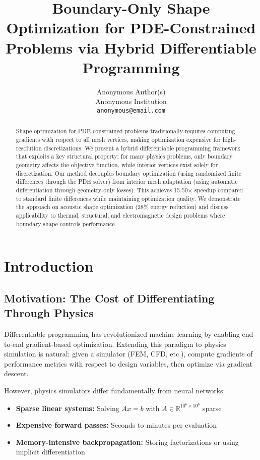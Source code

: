\documentclass{article}
\title{Boundary-Only Shape Optimization for PDE-Constrained Problems via Hybrid Differentiable Programming}
\author{%
  Anonymous Author(s) \\
  Anonymous Institution \\
  \texttt{anonymous@email.com}
}
\begin{document}
\maketitle

\begin{abstract}
Shape optimization for PDE-constrained problems traditionally requires computing gradients with respect to all mesh vertices, making optimization expensive for high-resolution discretizations. We present a hybrid differentiable programming framework that exploits a key structural property: for many physics problems, only boundary geometry affects the objective function, while interior vertices exist solely for discretization. Our method decouples boundary optimization (using randomized finite differences through the PDE solver) from interior mesh adaptation (using automatic differentiation through geometry-only losses). This achieves 15-50$\times$ speedup compared to standard finite differences while maintaining optimization quality. We demonstrate the approach on acoustic shape optimization (28\% energy reduction) and discuss applicability to thermal, structural, and electromagnetic design problems where boundary shape controls performance.
\end{abstract}

\section{Introduction}

\subsection{Motivation: The Cost of Differentiating Through Physics}

Differentiable programming has revolutionized machine learning by enabling end-to-end gradient-based optimization. Extending this paradigm to physics simulation is natural: given a simulator (FEM, CFD, etc.), compute gradients of performance metrics with respect to design variables, then optimize via gradient descent.

However, physics simulators differ fundamentally from neural networks:
\begin{itemize}
    \item \textbf{Sparse linear systems:} Solving $Ax = b$ with $A \in \mathbb{R}^{10^6 \times 10^6}$ sparse
    \item \textbf{Expensive forward passes:} Seconds to minutes per evaluation
    \item \textbf{Memory-intensive backpropagation:} Storing factorizations or using implicit differentiation
\end{itemize}
\end{document}
